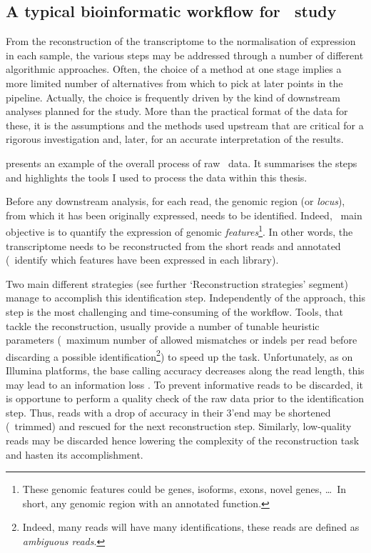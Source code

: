 \subsection{A typical bioinformatic workflow for \Rnaseq\ study}\label{sub;RNAseqworflow}

From the reconstruction of the
transcriptome to the normalisation of expression in each sample, the various
steps may be addressed through a number of different algorithmic approaches.
Often, the choice of a method at one stage implies a more limited number of
alternatives from which to pick at later points in the pipeline. Actually,
the choice is frequently driven by the kind of downstream analyses planned for
the study. More than the practical format of the data for these, it is the
assumptions and the methods used upstream that are critical for a
rigorous investigation and, later, for an accurate interpretation of the results.

 presents an example of the overall 
process of raw \Rnaseq\ data. It summarises the steps and highlights the tools
I used to process the data within this thesis.

Before any downstream analysis, for each read, the genomic region (or
\emph{locus}), from which it has been originally expressed, needs to be identified.
Indeed, \Rnaseq\ main objective is to quantify the expression of genomic
\emph{features}\footnote{These genomic features could be genes, isoforms,
exons, novel genes, \dots\
In short, any genomic region with an annotated function.}. In other words,
the transcriptome needs to be reconstructed from the short reads and annotated
(\ie\ identify which features have been expressed in each library).

Two main different strategies (see further `Reconstruction strategies' segment)
manage to accomplish this identification step. Independently of the
approach, this step is the most challenging and time-consuming
of the workflow. Tools, that tackle the reconstruction, usually provide a
number of tunable heuristic parameters (\eg\ maximum number of allowed mismatches
or indels per read before discarding a possible identification\footnote{Indeed,
many reads will have many identifications, these reads are defined as
\emph{ambiguous reads}.})
to speed up the task.
Unfortunately, as on Illumina platforms, the base calling accuracy decreases
along the read length, this may lead to an information loss .
To prevent informative reads to be discarded, it is opportune to perform a quality
check of the raw data prior to the identification step. Thus, reads with a drop of
accuracy in their 3'end may be shortened (\ie\ trimmed) and rescued for the next
reconstruction step. Similarly, low-quality reads may be discarded hence
lowering the complexity
of the reconstruction task and hasten its accomplishment.

